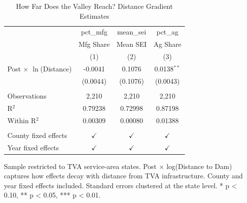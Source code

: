 
\begin{table}[htbp]
   \caption{\label{tab:gradient} How Far Does the Valley Reach? Distance Gradient Estimates}
   \bigskip
   \centering
   \begin{tabular}{lccc}
      \toprule
                                      & pct\_mfg      & mean\_sei     & pct\_ag\\   
                                      & Mfg Share     & Mean SEI      & Ag Share \\   
                                      & (1)           & (2)           & (3)\\  
      \midrule 
      Post $\times$ $\ln$(Distance)    & -0.0041       & 0.1076        & 0.0138$^{**}$\\   
                                      & (0.0044)      & (0.1076)      & (0.0043)\\   
       \\
      Observations                    & 2,210         & 2,210         & 2,210\\  
      R$^2$                           & 0.79238       & 0.72998       & 0.87198\\  
      Within R$^2$                    & 0.00309       & 0.00080       & 0.01388\\  
       \\
      County fixed effects        & $\checkmark$  & $\checkmark$  & $\checkmark$\\   
      Year fixed effects              & $\checkmark$  & $\checkmark$  & $\checkmark$\\   
      \bottomrule
   \end{tabular}
   
   \par \raggedright 
   Sample restricted to TVA service-area states. Post $\times$ log(Distance to Dam) captures how effects decay with distance from TVA infrastructure. County and year fixed effects included. Standard errors clustered at the state level. * p < 0.10, ** p < 0.05, *** p < 0.01.
\end{table}



